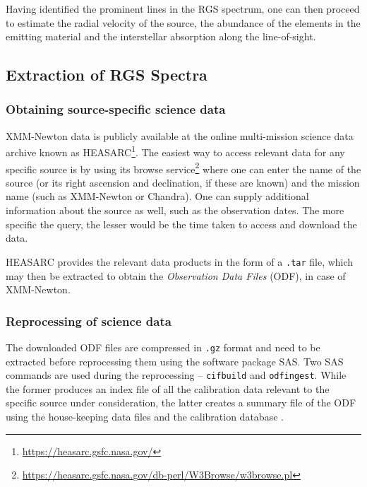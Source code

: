         Having identified the prominent lines in the RGS spectrum, one can then proceed to estimate the radial velocity of the source, the abundance of the elements in the emitting material and the interstellar absorption along the line-of-sight.
        
        \subsection{Extraction of RGS Spectra} \label{tool:rgs-files:extraction}
        
            \subsubsection{Obtaining source-specific science data} \label{tool:rgs-files:extraction:data}
                XMM-Newton data is publicly available at the online multi-mission science data archive known as HEASARC\footnote{\url{https://heasarc.gsfc.nasa.gov/}}. The easiest way to access relevant data for any specific source is by using its browse service\footnote{\url{https://heasarc.gsfc.nasa.gov/db-perl/W3Browse/w3browse.pl}} where one can enter the name of the source (or its right ascension and declination, if these are known) and the mission name (such as XMM-Newton or Chandra). One can supply additional information about the source as well, such as the observation dates. The more specific the query, the lesser would be the time taken to access and download the data.
                
                HEASARC provides the relevant data products in the form of a \texttt{.tar} file, which may then be extracted to obtain the \textit{Observation Data Files} (ODF), in case of XMM-Newton.
            
            \subsubsection{Reprocessing of science data} \label{tool:rgs-files:extraction:reprocess}
                The downloaded ODF files are compressed in \texttt{.gz} format and need to be extracted before reprocessing them using the software package SAS. Two SAS commands are used during the reprocessing – \texttt{cifbuild} and \texttt{odfingest}. While the former produces an index file of all the calibration data relevant to the specific source under consideration, the latter creates a summary file of the ODF using the house-keeping data files and the calibration database \cite{de2019users}.
                
